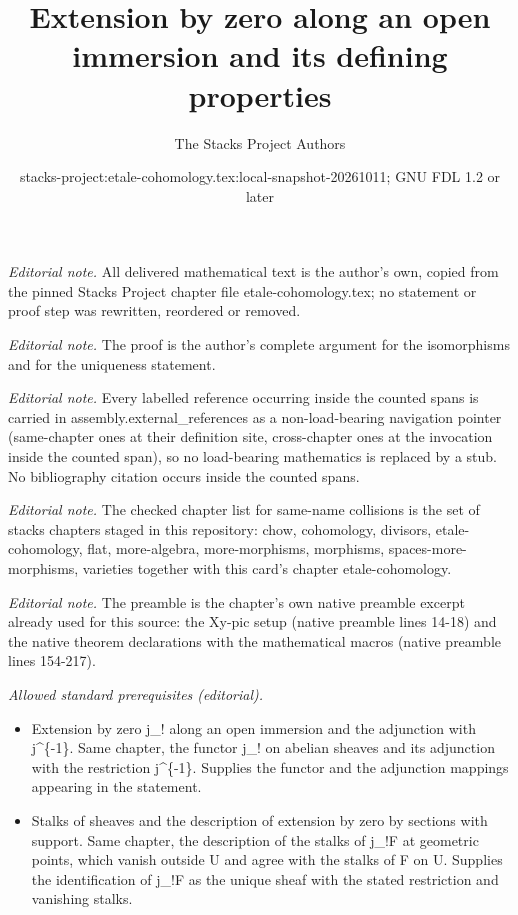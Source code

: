 \documentclass[10pt,a4paper]{amsart}
\title{Extension by zero along an open immersion and its defining properties}
\author{The Stacks Project Authors}
\date{stacks-project:etale-cohomology.tex:local-snapshot-20261011; GNU FDL 1.2 or later}
\theoremstyle{plain}
\theoremstyle{definition}
\theoremstyle{remark}
\numberwithin{equation}{subsection}
\begin{document}
\maketitle
\noindent\textit{Editorial note.} All delivered mathematical text is the author's own, copied from the pinned Stacks Project chapter file etale-cohomology.tex; no statement or proof step was rewritten, reordered or removed.\par\medskip
\noindent\textit{Editorial note.} The proof is the author's complete argument for the isomorphisms and for the uniqueness statement.\par\medskip
\noindent\textit{Editorial note.} Every labelled reference occurring inside the counted spans is carried in assembly.external\_references as a non-load-bearing navigation pointer (same-chapter ones at their definition site, cross-chapter ones at the invocation inside the counted span), so no load-bearing mathematics is replaced by a stub. No bibliography citation occurs inside the counted spans.\par\medskip
\noindent\textit{Editorial note.} The checked chapter list for same-name collisions is the set of stacks chapters staged in this repository: chow, cohomology, divisors, etale-cohomology, flat, more-algebra, more-morphisms, morphisms, spaces-more-morphisms, varieties together with this card's chapter etale-cohomology.\par\medskip
\noindent\textit{Editorial note.} The preamble is the chapter's own native preamble excerpt already used for this source: the Xy-pic setup (native preamble lines 14-18) and the native theorem declarations with the mathematical macros (native preamble lines 154-217).\par\medskip
\noindent\textit{Allowed standard prerequisites (editorial).}\begin{itemize}
\item Extension by zero j\_! along an open immersion and the adjunction with j\textasciicircum{}\{-1\}. Same chapter, the functor j\_! on abelian sheaves and its adjunction with the restriction j\textasciicircum{}\{-1\}. Supplies the functor and the adjunction mappings appearing in the statement.
\item Stalks of sheaves and the description of extension by zero by sections with support. Same chapter, the description of the stalks of j\_!F at geometric points, which vanish outside U and agree with the stalks of F on U. Supplies the identification of j\_!F as the unique sheaf with the stated restriction and vanishing stalks.
\end{itemize}\medskip
\end{document}
